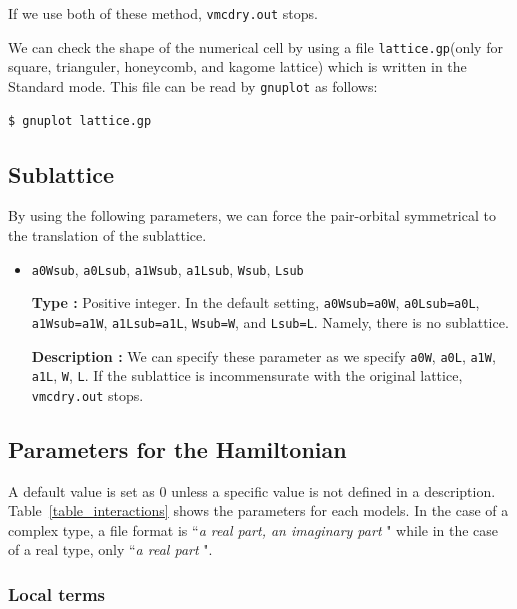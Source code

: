 If we use both of these method, \verb|vmcdry.out| stops.

We can check the shape of the numerical cell
by using a file \verb|lattice.gp|(only for
square, trianguler, honeycomb, and kagome lattice)
which is written in the Standard mode.
This file can be read by \verb|gnuplot| as follows:
\begin{verbatim}
$ gnuplot lattice.gp
\end{verbatim}

\subsection{Sublattice}

By using the following parameters, we can force the pair-orbital symmetrical
to the translation of the sublattice.

\begin{itemize}

\item \verb|a0Wsub|, \verb|a0Lsub|, \verb|a1Wsub|, \verb|a1Lsub|, \verb|Wsub|, \verb|Lsub|

{\bf Type :} Positive integer. In the default setting, 
\verb|a0Wsub=a0W|, \verb|a0Lsub=a0L|, \verb|a1Wsub=a1W|, \verb|a1Lsub=a1L|, 
\verb|Wsub=W|, and \verb|Lsub=L|. Namely, there is no sublattice.

{\bf Description :} We can specify these parameter as we specify
\verb|a0W|, \verb|a0L|, \verb|a1W|, \verb|a1L|, \verb|W|, \verb|L|.
If the sublattice is incommensurate with the original lattice,
\verb|vmcdry.out| stops.

\end{itemize}

\subsection{Parameters for the Hamiltonian}
A default value is set as $0$ unless a specific value is not defined in a description. 
Table~\ref{table_interactions} shows the parameters for each models. 
In the case of a complex type, a file format is ``{\it a real part, an imaginary part} "
 while in the case of a real type, only ``{\it a real part} ".

\subsubsection{Local terms}


